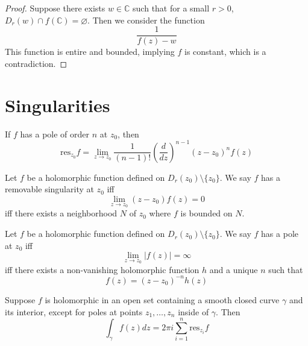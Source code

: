 \documentclass[openany]{book}
\newcommand{\C}{\mathbb{C}}
\begin{document}
\begin{proof}
    Suppose there exists $w\in\C$ such that for a small $r>0$, $D_r(w)\cap f(\C)=\varnothing$. Then we consider the function 
    \begin{equation*}
        \frac{1}{f(z)-w}
    \end{equation*}
    This function is entire and bounded, implying $f$ is constant, which is a contradiction.
\end{proof}






\chapter{Singularities}

\begin{defn}[residue]
    If $f$ has a pole of order $n$ at $z_0$, then 
    \begin{equation*}
        \text{res}_{z_0}f=\lim_{z\to z_0}\frac{1}{(n-1)!}\left(\frac{d}{dz}\right)^{n-1}(z-z_0)^nf(z)
    \end{equation*}
\end{defn}

\begin{prop}
    Let $f$ be a holomorphic function defined on $D_r(z_0)\setminus\{z_0\}$. We say $f$ has a removable singularity at $z_0$ iff 
    \begin{equation*}
        \lim_{z\to z_0}(z-z_0)f(z)=0
    \end{equation*}
    iff there exists a neighborhood $N$ of $z_0$ where $f$ is bounded on $N$.
\end{prop}

\begin{prop}[Pole]
    Let $f$ be a holomorphic function defined on $D_r(z_0)\setminus\{z_0\}$. We say $f$ has a pole at $z_0$ iff 
    \begin{equation*}
        \lim_{z\to z_0}|f(z)|=\infty
    \end{equation*}
    iff there exists a non-vanishing holomorphic function $h$ and a unique $n$ such that 
    \begin{equation*}
        f(z)=(z-z_0)^{-n}h(z)
    \end{equation*}
\end{prop}





\begin{prop}
    Suppose $f$ is holomorphic in an open set containing a smooth closed curve $\gamma$ and its interior, except for poles at points $z_1,\dots, z_n$ inside of $\gamma$. Then 
    \begin{equation*}
        \int_{\gamma}f(z)dz=2\pi i\sum_{i=1}^n\text{res}_{z_i}f
    \end{equation*}
\end{prop}
\end{document}
